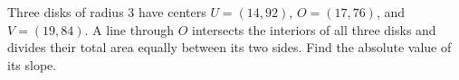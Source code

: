 Three disks of radius $3$ have centers $U=(14,92)$, $O=(17,76)$, and $V=(19,84)$. A line through $O$ intersects the interiors of all three disks and divides their total area equally between its two sides. Find the absolute value of its slope.
